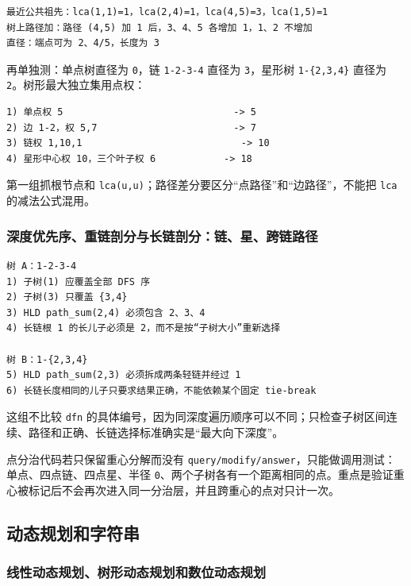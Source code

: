 \begin{lstlisting}
最近公共祖先：lca(1,1)=1，lca(2,4)=1，lca(4,5)=3，lca(1,5)=1
树上路径加：路径 (4,5) 加 1 后，3、4、5 各增加 1，1、2 不增加
直径：端点可为 2、4/5，长度为 3
\end{lstlisting}

再单独测：单点树直径为 \passthrough{\lstinline!0!}，链 \passthrough{\lstinline!1-2-3-4!} 直径为 \passthrough{\lstinline!3!}，星形树 \passthrough{\lstinline!1-\{2,3,4\}!} 直径为 \passthrough{\lstinline!2!}。树形最大独立集用点权：

\begin{lstlisting}
1) 单点权 5                              -> 5
2) 边 1-2，权 5,7                        -> 7
3) 链权 1,10,1                            -> 10
4) 星形中心权 10，三个叶子权 6            -> 18
\end{lstlisting}

第一组抓根节点和 \passthrough{\lstinline!lca(u,u)!}；路径差分要区分``点路径''和``边路径''，不能把 \passthrough{\lstinline!lca!} 的减法公式混用。

\subsubsection{深度优先序、重链剖分与长链剖分：链、星、跨链路径}

\begin{lstlisting}
树 A：1-2-3-4
1) 子树(1) 应覆盖全部 DFS 序
2) 子树(3) 只覆盖 {3,4}
3) HLD path_sum(2,4) 必须包含 2、3、4
4) 长链根 1 的长儿子必须是 2，而不是按“子树大小”重新选择

树 B：1-{2,3,4}
5) HLD path_sum(2,3) 必须拆成两条轻链并经过 1
6) 长链长度相同的儿子只要求结果正确，不能依赖某个固定 tie-break
\end{lstlisting}

这组不比较 \passthrough{\lstinline!dfn!} 的具体编号，因为同深度遍历顺序可以不同；只检查子树区间连续、路径和正确、长链选择标准确实是``最大向下深度''。

点分治代码若只保留重心分解而没有 \passthrough{\lstinline!query/modify/answer!}，只能做调用测试：单点、四点链、四点星、半径 \passthrough{\lstinline!0!}、两个子树各有一个距离相同的点。重点是验证重心被标记后不会再次进入同一分治层，并且跨重心的点对只计一次。

\subsection{动态规划和字符串}

\subsubsection{线性动态规划、树形动态规划和数位动态规划}

